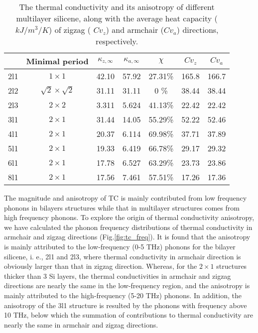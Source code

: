\documentclass[aps,prb,twocolumn,showpacs,amsmath,amssymb]{revtex4-1}
\begin{document}
\begin{table*}
  \caption{\label{tab:table1}
    The thermal conductivity and its anisotropy of different multilayer silicene, along with the average heat capacity ($kJ/m^3/K$) of zigzag ( $Cv_z$) and armchair ($Cv_a$) directions, respectively. }
  \begin{ruledtabular}
    \begin{tabular}{ccccccc}
          & Minimal period
          & $\kappa_{z,\infty}$
          & $\kappa_{a,\infty}$
          & $\chi$
          & $Cv_{z}$
          & $Cv_{a}$                                                           \\
      \hline
      2l1 & $1 \times 1$             & 42.10 & 57.92 & 27.31\% & 165.8 & 166.7 \\
      2l2 & $\sqrt{2}\times\sqrt{2}$ & 31.11 & 31.11 & 0    \% & 38.44 & 38.44 \\
      2l3 & $2 \times 2$             & 3.311 & 5.624 & 41.13\% & 22.42 & 22.42 \\
      3l1 & $2 \times 1$             & 31.44 & 14.05 & 55.29\% & 52.22 & 52.46 \\
      4l1 & $2 \times 1$             & 20.37 & 6.114 & 69.98\% & 37.71 & 37.89 \\
      5l1 & $2 \times 1$             & 19.33 & 6.419 & 66.78\% & 29.17 & 29.32 \\
      6l1 & $2 \times 1$             & 17.78 & 6.527 & 63.29\% & 23.73 & 23.86 \\
      8l1 & $2 \times 1$             & 17.56 & 7.461 & 57.51\% & 17.26 & 17.36 \\
    \end{tabular}
  \end{ruledtabular}
\end{table*}

The magnitude and anisotropy of TC is mainly contributed from low frequency phonons in bilayers structures while that in multilayer structures comes from high frequency phonons. To explore the origin of thermal conductivity anisotropy, we have calculated the phonon frequency distributions of thermal conductivity in armchair and zigzag directions  (Fig.\ref{fig:tc_freq}).
It is found that the anisotropy is mainly attributed to the low-frequency (0-5 THz) phonons for the bilayer silicene, i. e., 2l1 and 2l3, where thermal conductivity in armchair direction is obviously larger than that in zigzag direction.
Whereas,  for the $2\times1$ structures thicker than 3 Si layers, the thermal conductivities in armchair and zigzag directions are nearly the same in the low-frequency region, and the anisotropy is mainly attributed to the high-frequency (5-20 THz) phonons.
In addition, the anisotropy of the 3l1 structure is resulted by the phonons with frequency above 10 THz, below which the summation of contributions to thermal conductivity are nearly the same in armchair and zigzag directions.
\end{document}
